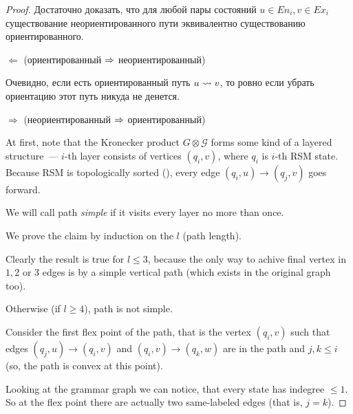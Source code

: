 \begin{proof}

  Достаточно доказать, что для любой пары состояний $u \in En_i, v \in Ex_i$ существование неориентированного пути эквивалентно существованию ориентированного.


  $\Leftarrow$ (ориентированный $\Rightarrow$ неориентированный)

  Очевидно, если есть ориентированный путь $u \rightsquigarrow v$, то ровно если убрать ориентацию этот путь никуда не денется.


  $\Rightarrow$ (неориентированный $\Rightarrow$ ориентированный)


  At first, note that the Kronecker product $G \otimes \mathcal{G}$ forms some kind of a layered structure~--- $i$-th layer consists of vertices $(q_i, v)$, where $q_i$ is $i$-th RSM state. Because RSM is topologically sorted ({\color{red}{TODO}}), every edge $(q_i, u) \rightarrow (q_j, v)$ goes forward.

  We will call path \textit{simple} if it visits every layer no more than once.

  We prove the claim by induction on the $l$ (path length).

  Clearly the result is true for $l \le 3$, because the only way to achive final vertex in $1, 2$ or $3$ edges is by a simple vertical path (which exists in the original graph too).

  Otherwise (if $l \ge 4$), path is not simple. 

  Consider the first flex point of the path, that is the vertex $(q_i, v)$ such that edges $(q_j, u) \rightarrow (q_i, v)$ and $(q_i, v) \rightarrow (q_k, w)$ are in the path and $j, k \le i$ (so, the path is convex at this point).

  Looking at the grammar graph we can notice, that every state has indegree $\le 1$. So at the flex point there are actually two same-labeled edges (that is, $j = k$). 


\end{proof}
